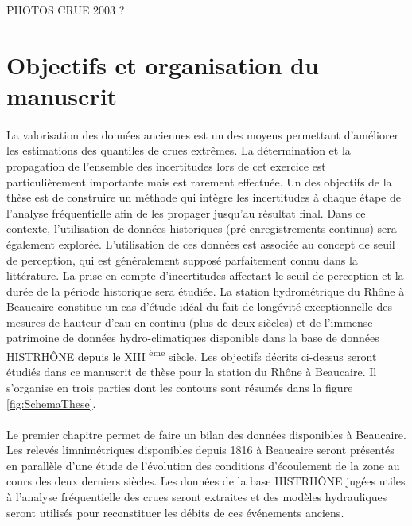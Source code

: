\documentclass[11pt]{article}
\begin{document}
	PHOTOS CRUE 2003 ?

	\section{Objectifs et organisation du manuscrit}
	
%

	\paragraph{} La valorisation des données anciennes est un des moyens permettant d'améliorer les estimations des quantiles de crues extrêmes. La détermination et la propagation de l'ensemble des incertitudes lors de cet exercice est particulièrement importante mais est rarement effectuée. Un des objectifs de la thèse est de construire un méthode qui intègre les incertitudes à chaque étape de l'analyse fréquentielle afin de les propager jusqu'au résultat final. Dans ce contexte, l'utilisation de données historiques (pré-enregistrements continus) sera également explorée. L'utilisation de ces données est associée au concept de seuil de perception, qui est généralement supposé parfaitement connu dans la littérature. La prise en compte d'incertitudes affectant le seuil de perception et la durée de la période historique sera étudiée. La station hydrométrique du Rhône à Beaucaire constitue un cas d'étude idéal du fait de longévité exceptionnelle des mesures de hauteur d'eau en continu (plus de deux siècles) et de l'immense patrimoine de données hydro-climatiques disponible dans la base de données HISTRHÔNE depuis le XIII \textsuperscript{ème} siècle. Les objectifs décrits ci-dessus seront étudiés dans ce manuscrit de thèse pour la station du Rhône à Beaucaire. Il s'organise en trois parties dont les contours sont résumés dans la figure \ref{fig:SchemaThese}. 
	
	\paragraph{} Le premier chapitre permet de faire un bilan des données disponibles à Beaucaire. Les relevés limnimétriques disponibles depuis 1816 à Beaucaire seront présentés en parallèle d'une étude de l'évolution des conditions d'écoulement de la zone au cours des deux derniers siècles. Les données de la base HISTRHÔNE jugées utiles à l'analyse fréquentielle des crues seront extraites et des modèles hydrauliques seront utilisés pour reconstituer les débits de ces événements anciens. 
	
\end{document}
